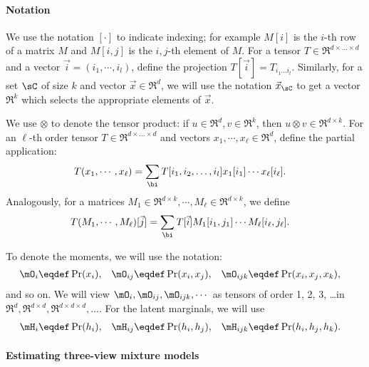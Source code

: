 \paragraph{Notation}

We use the notation $[\cdot]$ to indicate indexing; for example $M[i]$
  is the $i$-th row of a matrix $M$ and $M[i,j]$ is the $i,j$-th element
  of $M$.
For a tensor $T \in \Re^{d \times \ldots \times d}$ and a vector $\vec
  i = (i_1, \cdots, i_l)$, define the projection $T[\vec i] = T_{i_1 \ldots i_l}$.
Similarly, for a set $\sC$ of size $k$ and vector $\vec x \in \Re^d$, we
  will use the notation $\vec x_\sC$ to get a vector $\Re^k$ which selects
  the appropriate elements of $\vec x$.

We use $\otimes$ to denote the tensor product: if $u \in \Re^d,
  v \in \Re^k$, then $u \otimes v \in \Re^{d \times k}$.
For an $\ell$-th order tensor $T \in \Re^{d \times \ldots \times
  d}$ and vectors $x_1, \cdots, x_\ell \in \Re^{d}$, define 
  the partial application:
\begin{align*}
  T(x_1, \cdots, x_\ell) 
  &= \sum_{\bi}
            T[i_1, i_2, \ldots, i_l] x_1[i_1] \cdots x_\ell[i_\ell].
\end{align*}
Analogously, for a matrices $M_1 \in \Re^{d \times k}, \cdots,
  M_\ell \in \Re^{d \times k}$, we define
\begin{align*}
  T(M_1, \cdots, M_\ell)[\vec j]
  &= \sum_{\bi}
            T[\vec i] {M_1}[i_1,j_1] \cdots M_\ell[i_\ell, j_\ell].
\end{align*}

To denote the moments, we will use the notation:
\begin{align*}
  \mO_i &\eqdef \Pr(x_i), &
  \mO_{ij} &\eqdef \Pr(x_i, x_j), &
  \mO_{ijk} &\eqdef \Pr(x_i, x_j, x_k),
\end{align*}
and so on.
We will view $\mO_i, \mO_{ij}, \mO_{ijk}, \cdots$ as tensors of
  order 1, 2, 3, \ldots in $\Re^d, \Re^{d\times d}, \Re^{d \times
  d \times d},\ldots$.
For the latent marginals, we will use 
\begin{align*}
  \mH_i &\eqdef \Pr(h_i), &
  \mH_{ij} &\eqdef \Pr(h_i, h_j), &
  \mH_{ijk} &\eqdef \Pr(h_i, h_j, h_k).
\end{align*}


\paragraph{Estimating three-view mixture models}

